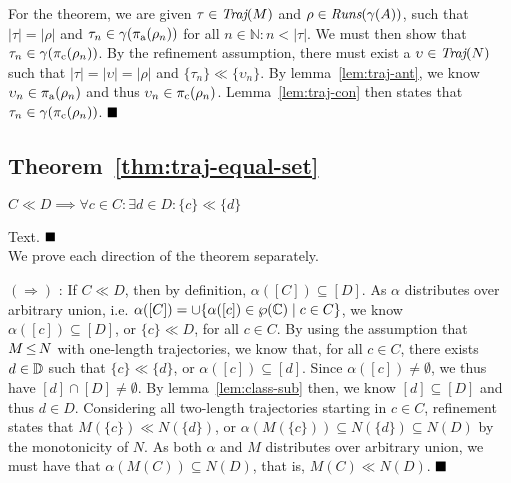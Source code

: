 
For the theorem, we are given $\tau \in \operatorname{\textit{Traj}}(M)$ and $\rho \in \operatorname{\textit{Runs}}(\gamma(A))$, such that $| \tau | = | \rho |$ and $\tau_{n} \in \gamma(\operatorname{\pi_{\textrm{a}}}(\rho_{n}))$ for all $n \in \mathbb{N} : n < | \tau |$. We must then show that $\tau_{n} \in \gamma(\operatorname{\pi_{\textrm{c}}}(\rho_{n}))$. By the refinement assumption, there must exist a $\upsilon \in \operatorname{\textit{Traj}}(N)$ such that $| \tau | = | \upsilon | = | \rho |$ and $\{ \tau_{n} \} \ll \{ \upsilon_{n} \}$. By lemma~\ref{lem:traj-ant}, we know $\upsilon_{n} \in \operatorname{\pi_{\textrm{a}}}(\rho_{n})$ and thus $\upsilon_{n} \in \operatorname{\pi_{\textrm{c}}}(\rho_{n})$. Lemma~\ref{lem:traj-con} then states that $\tau_{n} \in \gamma(\operatorname{\pi_{\textrm{c}}}(\rho_{n}))$. $\qedbox$

\subsection{Theorem~\ref{thm:traj-equal-set}}

\begin{lemma} \label{lem:name}
$C \ll D \implies \forall c \in C: \exists d \in D: \{ c \} \ll \{ d \}$
\end{lemma}

Text. $\qedbox$
\\

We prove each direction of the theorem separately.

$(\Rightarrow)$ : If $C \ll D$, then by definition, $\alpha([C]) \subseteq [D]$. As $\alpha$ distributes over arbitrary union, i.e. $\alpha([C]) = \cup \{ \alpha([c]) \in \wp(\mathbb{C}) \mid c \in C \}$, we know $\alpha([c]) \subseteq [D]$, or $\{ c \} \ll D$, for all $c \in C$. By using the assumption that $M \operatorname{\leq} N$ with one-length trajectories, we know that, for all $c \in C$, there exists $d \in \mathbb{D}$ such that $\{ c \} \ll \{ d \}$, or $\alpha([c]) \subseteq [d]$. Since $\alpha([c]) \neq \emptyset$, we thus have $[d] \cap [D] \neq \emptyset$. By lemma~\ref{lem:class-sub} then, we know $[d] \subseteq [D]$ and thus $d \in D$. Considering all two-length trajectories starting in $c \in C$, refinement states that $M(\{ c \}) \ll N(\{ d \})$, or $\alpha(M(\{ c \})) \subseteq N(\{ d \}) \subseteq N(D)$ by the monotonicity of $N$. As both $\alpha$ and $M$ distributes over arbitrary union, we must have that $\alpha(M(C)) \subseteq N(D)$, that is, $M(C) \ll N(D)$. $\qedbox$

